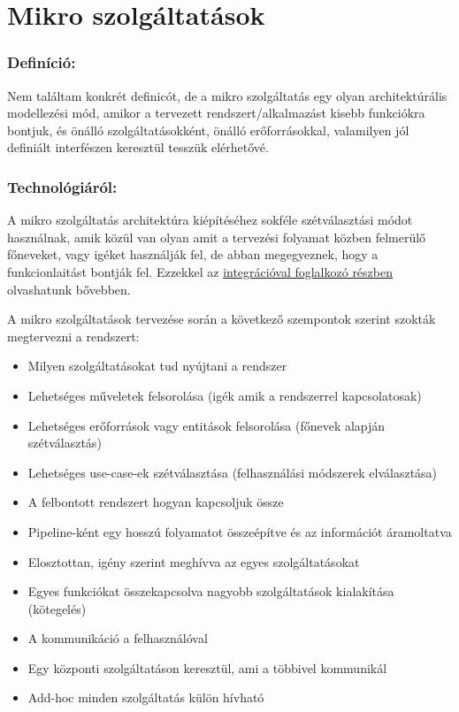 \documentclass[11pt,magyar,a4paper,oneside,]{report}
\begin{document}
\chapter{Mikro szolgáltatások}\label{mikro-szolguxe1ltatuxe1sok}

\subsection{Definíció:}\label{definuxedciuxf3}

Nem találtam konkrét definicót, de a mikro szolgáltatás egy olyan
architektúrális modellezési mód, amikor a tervezett
rendszert/alkalmazást kisebb funkciókra bontjuk, és önálló
szolgáltatásokként, önálló erőforrásokkal, valamilyen jól definiált
interfészen keresztül tesszük elérhetővé.

\subsection{Technológiáról:}\label{technoluxf3giuxe1ruxf3l}

A mikro szolgáltatás architektúra kiépítéséhez sokféle szétválasztási
módot használnak, amik közül van olyan amit a tervezési folyamat közben
felmerülő főneveket, vagy igéket használják fel, de abban megegyeznek,
hogy a funkcionlaitást bontják fel. Ezzekkel az
\href{Integrációs-minták}{integrációval foglalkozó részben} olvashatunk
bővebben.

A mikro szolgáltatások tervezése során a következő szempontok szerint
szokták megtervezni a rendszert:

\begin{itemize}
\itemsep1pt\parskip0pt
\item
  Milyen szolgáltatásokat tud nyújtani a rendszer
\item
  Lehetséges műveletek felsorolása (igék amik a rendszerrel
  kapcsolatosak)
\item
  Lehetséges erőforrások vagy entitások felsorolása (főnevek alapján
  szétválasztás)
\item
  Lehetséges use-case-ek szétválasztása (felhasználási módszerek
  elválasztása)
\item
  A felbontott rendszert hogyan kapcsoljuk össze
\item
  Pipeline-ként egy hosszú folyamatot összeépítve és az információt
  áramoltatva
\item
  Elosztottan, igény szerint meghívva az egyes szolgáltatásokat
\item
  Egyes funkciókat összekapcsolva nagyobb szolgáltatások kialakítása
  (kötegelés)
\item
  A kommunikáció a felhasználóval
\item
  Egy központi szolgáltatáson keresztül, ami a többivel kommunikál
\item
  Add-hoc minden szolgáltatás külön hívható
\end{itemize}
\end{document}
